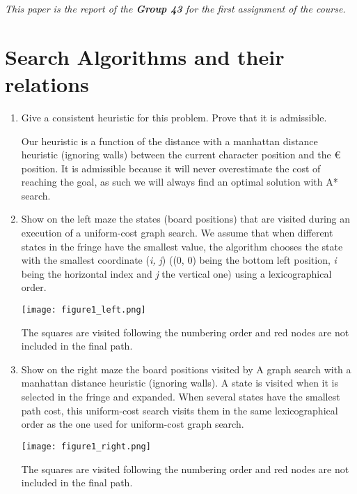 \bigskip
\textit{This paper is the report of the \textbf{Group 43} for the first assignment
of the course.}

\section{Search Algorithms and their relations}

\begin{enumerate}
 \item Give a consistent heuristic for this problem. Prove that it is admissible.
    \begin{framed}
        Our heuristic is a function of the distance with a manhattan
        distance heuristic (ignoring walls) between
        the current character position and the \euro{} position. It is
        admissible because it will never overestimate the cost of reaching
        the goal, as such we will always find an optimal solution with A*
        search. 
    \end{framed}
 \item Show on the left maze the states (board positions) that are visited during an
execution of a uniform-cost graph search. We assume that when different states
in the fringe have the smallest value, the algorithm chooses the state with
the smallest coordinate (\textit{i, j}) ((0, 0) being the bottom left position, \textit{i} being the
horizontal index and \textit{j} the vertical one) using a lexicographical order.
    \begin{framed}
        \begin{center}
        \texttt{[image: figure1\_left.png]}
        \end{center}

        The squares are visited following the numbering order and red nodes
        are not included in the final path. 
    \end{framed}
  \item Show on the right maze the board positions visited by A graph search with
a manhattan distance heuristic (ignoring walls). A state is visited when it is
selected in the fringe and expanded. When several states have the smallest
path cost, this uniform-cost search visits them in the same lexicographical order
as the one used for uniform-cost graph search.
    \begin{framed}
        \begin{center}
        \texttt{[image: figure1\_right.png]}
        \end{center}

        The squares are visited following the numbering order and red nodes
        are not included in the final path. 
    \end{framed}

\end{enumerate}

